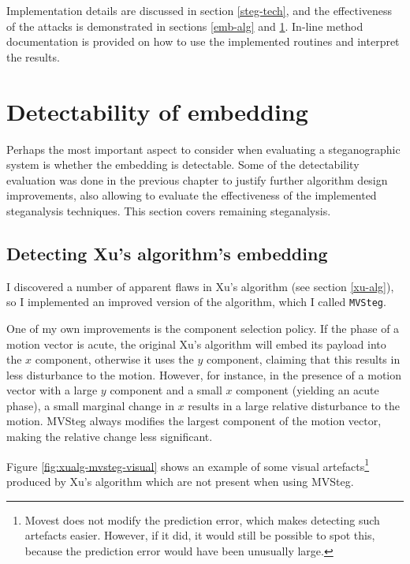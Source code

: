 \documentclass[12pt,british,twoside,notitlepage,usenames,dvipsnames,hypens,final]{report}
\numberwithin{equation}{section}
\numberwithin{figure}{section}
\begin{document}
Implementation details are discussed in section \ref{steg-tech}, and the effectiveness of the attacks is demonstrated in sections \ref{emb-alg} and \ref{rem-detect-eval}. In-line method documentation is provided on how to use the implemented routines and interpret the results. 

\section{Detectability of embedding}
\label{rem-detect-eval}

Perhaps the most important aspect to consider when evaluating a steganographic system is whether the embedding is detectable. Some of the detectability evaluation was done in the previous chapter to justify further algorithm design improvements, also allowing to evaluate the effectiveness of the implemented steganalysis techniques. This section covers remaining steganalysis.

\subsection{Detecting Xu's algorithm's embedding}
\label{breaking-xu}

I discovered a number of apparent flaws in Xu's algorithm (see section \ref{xu-alg}), so I implemented an improved version of the algorithm, which I called \texttt{MVSteg}.

One of my own improvements is the component selection policy. If the phase of a motion vector is acute, the original Xu's algorithm will embed its payload into the $x$ component, otherwise it uses the $y$ component, claiming that this results in less disturbance to the motion. However, for instance, in the presence of a motion vector with a large $y$ component and a small $x$ component (yielding an acute phase), a small marginal change in $x$ results in a large relative disturbance to the motion. MVSteg always modifies the largest component of the motion vector, making the relative change less significant.

Figure \ref{fig:xualg-mvsteg-visual} shows an example of some visual artefacts\footnote{Movest does not modify the prediction error, which makes detecting such artefacts easier. However, if it did, it would still be possible to spot this, because the prediction error would have been unusually large.} produced by Xu's algorithm which are not present when using MVSteg.
\end{document}
